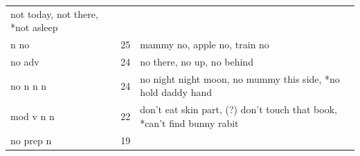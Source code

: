 \documentclass[man,floatsintext,draftall]{apa6}
\begin{document}
\begin{longtable}[]{@{}lll@{}}
\begin{minipage}[t]{0.47\columnwidth}
not today, not there, *not asleep\strut
\end{minipage}\tabularnewline
\begin{minipage}[t]{0.23\columnwidth}\raggedright\strut
n no\strut
\end{minipage} & \begin{minipage}[t]{0.15\columnwidth}\raggedright\strut
25\strut
\end{minipage} & \begin{minipage}[t]{0.47\columnwidth}\raggedright\strut
mammy no, apple no, train no\strut
\end{minipage}\tabularnewline
\begin{minipage}[t]{0.23\columnwidth}\raggedright\strut
no adv\strut
\end{minipage} & \begin{minipage}[t]{0.15\columnwidth}\raggedright\strut
24\strut
\end{minipage} & \begin{minipage}[t]{0.47\columnwidth}\raggedright\strut
no there, no up, no behind\strut
\end{minipage}\tabularnewline
\begin{minipage}[t]{0.23\columnwidth}\raggedright\strut
no n n n\strut
\end{minipage} & \begin{minipage}[t]{0.15\columnwidth}\raggedright\strut
24\strut
\end{minipage} & \begin{minipage}[t]{0.47\columnwidth}\raggedright\strut
no night night moon, no mummy this side, *no hold daddy hand\strut
\end{minipage}\tabularnewline
\begin{minipage}[t]{0.23\columnwidth}\raggedright\strut
mod v n n\strut
\end{minipage} & \begin{minipage}[t]{0.15\columnwidth}\raggedright\strut
22\strut
\end{minipage} & \begin{minipage}[t]{0.47\columnwidth}\raggedright\strut
don't eat skin part, (?) don't touch that book, *can't find bunny
rabit\strut
\end{minipage}\tabularnewline
\begin{minipage}[t]{0.23\columnwidth}\raggedright\strut
no prep n\strut
\end{minipage} & \begin{minipage}[t]{0.15\columnwidth}\raggedright\strut
19\strut
\end{minipage} & \begin{minipage}[t]{0.47\columnwidth}\raggedright\strut

\end{minipage}
\end{longtable}
\end{document}
